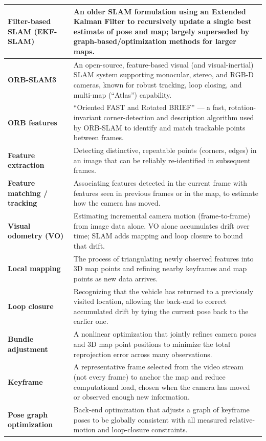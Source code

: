 \documentclass[11pt,a4paper]{article}
\begin{document}
\begin{longtable}{@{}p{4.5cm}p{10.5cm}@{}}
    \midrule
    \textbf{Filter-based SLAM (EKF-SLAM)} & An older SLAM formulation using an Extended Kalman Filter to recursively update a single best estimate of pose and map; largely superseded by graph-based/optimization methods for larger maps. \\
    \midrule
    \textbf{ORB-SLAM3} & An open-source, feature-based visual (and visual-inertial) SLAM system supporting monocular, stereo, and RGB-D cameras, known for robust tracking, loop closing, and multi-map (``Atlas'') capability. \\
    \midrule
    \textbf{ORB features} & ``Oriented FAST and Rotated BRIEF'' --- a fast, rotation-invariant corner-detection and description algorithm used by ORB-SLAM to identify and match trackable points between frames. \\
    \midrule
    \textbf{Feature extraction} & Detecting distinctive, repeatable points (corners, edges) in an image that can be reliably re-identified in subsequent frames. \\
    \midrule
    \textbf{Feature matching / tracking} & Associating features detected in the current frame with features seen in previous frames or in the map, to estimate how the camera has moved. \\
    \midrule
    \textbf{Visual odometry (VO)} & Estimating incremental camera motion (frame-to-frame) from image data alone. VO alone accumulates drift over time; SLAM adds mapping and loop closure to bound that drift. \\
    \midrule
    \textbf{Local mapping} & The process of triangulating newly observed features into 3D map points and refining nearby keyframes and map points as new data arrives. \\
    \midrule
    \textbf{Loop closure} & Recognizing that the vehicle has returned to a previously visited location, allowing the back-end to correct accumulated drift by tying the current pose back to the earlier one. \\
    \midrule
    \textbf{Bundle adjustment} & A nonlinear optimization that jointly refines camera poses and 3D map point positions to minimize the total reprojection error across many observations. \\
    \midrule
    \textbf{Keyframe} & A representative frame selected from the video stream (not every frame) to anchor the map and reduce computational load, chosen when the camera has moved or observed enough new information. \\
    \midrule
    \textbf{Pose graph optimization} & Back-end optimization that adjusts a graph of keyframe poses to be globally consistent with all measured relative-motion and loop-closure constraints. \\

\end{longtable}
\end{document}
